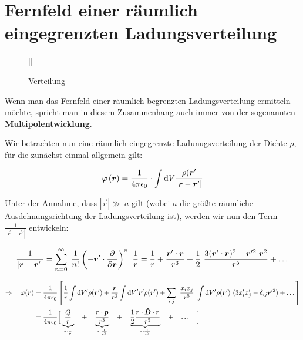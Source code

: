 \section{Fernfeld einer räumlich eingegrenzten Ladungsverteilung}

\begin{wrapfigure}[]{l}[0cm]{0cm}
	\raisebox{0pt}[\dimexpr{}\baselineskip\relax]{
		\colorbox{hgrey}{
		}
	}
	\caption{Verteilung}
\end{wrapfigure}

Wenn man das Fernfeld einer räumlich begrenzten Ladungsverteilung ermitteln möchte, spricht man in diesem Zusammenhang auch immer von der sogenannten \textbf{Multipolentwicklung}.

Wir betrachten nun eine räumlich eingegrenzte Ladunugsverteilung der Dichte $\rho$, für die zunächst einmal allgemein gilt:

\begin{equation*}
\varphi\left(\bm{r}\right) = \frac{1}{4\pi\epsilon_0}\cdot\int\mathrm{d} V \frac{\rho(\bm{r}'}{|\bm{r}-\bm{r}'|}
\end{equation*}

Unter der Annahme, dass $|\vec{r}| \gg \ a$ gilt (wobei $a$ die größte räumliche Ausdehnungsrichtung der Ladungsverteilung ist), werden wir nun den Term $\frac{1}{|\vec{r}-\vec{r}'|}$ entwickeln:

\begin{equation*}
\frac{1}{|\bm{r}-\bm{r}'|} = \sum_{n=0}^{\infty} \; \frac{1}{n!}\left(-\bm{r}'\cdot\frac{\partial{}}{\partial{\bm{r}}}\right)^n \ \frac{1}{r} = \frac{1}{r} + \frac{\bm{r}'\cdot\bm{r}}{r^3} + \frac{1}{2} \ \frac{3 (\bm{r}'\cdot\bm{r})^2 - \bm{r}'^2 \ \bm{r}^2}{r^5} + \dotsc
\end{equation*}

\begin{align*}
\Rightarrow \quad \varphi(\bm{r}) &= \frac{1}{4\pi\epsilon_0} \left[ \frac{1}{r}\int\mathrm{d} V' \rho(\bm{r}') + \frac{\bm{r}}{r^3} \int\mathrm{d} V' \bm{r}' \rho(\bm{r}') + \sum_{i,j} \ \frac{x_i x_j}{r^5} \ \int\mathrm{d} V' \rho(\bm{r}') \ (3x_i'x_j' - \delta_{ij}\bm{r}'^2) + \dotsc\right] \\
&= \frac{1}{4\pi\epsilon_0} \Big[\underbrace{\frac{Q}{r}}_{\sim\frac{1}{r}} \quad + \quad \underbrace{\frac{\bm{r}\cdot\bm{p}}{r^3}}_{\sim\frac{1}{r^2}} \quad + \quad \underbrace{\frac{1}{2}\frac{\bm{r}\cdot \bm{\hat{D}} \cdot\bm{r}}{r^5}}_{\sim\frac{1}{r^3}} \quad + \quad \dotsc \quad \Big]
\end{align*}

